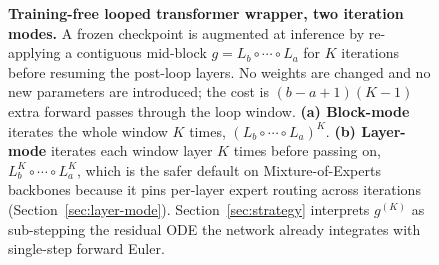\begin{figure}[t]
{
}
\vspace{-2pt}
\caption{\textbf{Training-free looped transformer wrapper, two iteration modes.} A frozen checkpoint is augmented at inference by re-applying a contiguous mid-block $g = L_b\circ\cdots\circ L_a$ for $K$ iterations before resuming the post-loop layers. No weights are changed and no new parameters are introduced; the cost is $(b-a+1)(K-1)$ extra forward passes through the loop window. \textbf{(a) Block-mode} iterates the whole window $K$ times, $(L_b\circ\cdots\circ L_a)^K$. \textbf{(b) Layer-mode} iterates each window layer $K$ times before passing on, $L_b^K\circ\cdots\circ L_a^K$, which is the safer default on Mixture-of-Experts backbones because it pins per-layer expert routing across iterations (Section~\ref{sec:layer-mode}). Section~\ref{sec:strategy} interprets $g^{(K)}$ as sub-stepping the residual ODE the network already integrates with single-step forward Euler.}
\label{fig:method}
\end{figure}
